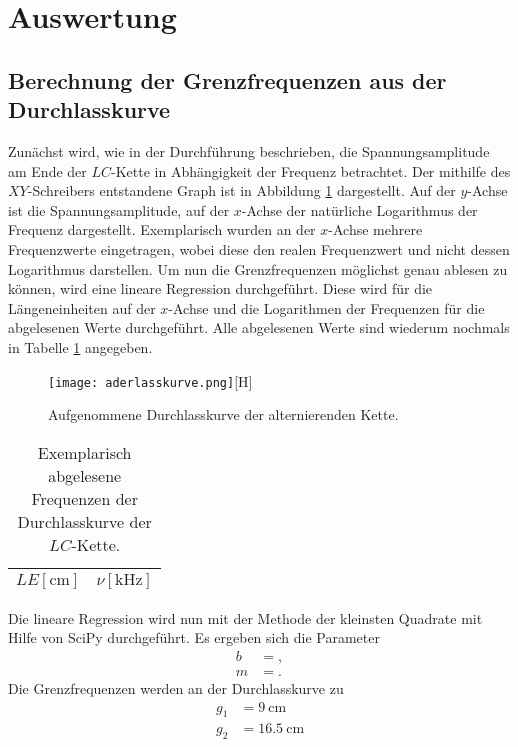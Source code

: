 \section{Auswertung}
\label{sec:Auswertung}
\subsection{Berechnung der Grenzfrequenzen aus der Durchlasskurve}
Zunächst wird, wie in der Durchführung beschrieben, die Spannungsamplitude am Ende der $LC$-Kette in Abhängigkeit der Frequenz betrachtet.
Der mithilfe des $XY$-Schreibers entstandene Graph ist in Abbildung \ref{fig:durchlass} dargestellt.
Auf der $y$-Achse ist die Spannungsamplitude, auf der $x$-Achse der natürliche Logarithmus der Frequenz dargestellt.
Exemplarisch wurden an der $x$-Achse mehrere Frequenzwerte eingetragen, wobei diese den realen Frequenzwert und nicht dessen Logarithmus darstellen.
Um nun die Grenzfrequenzen möglichst genau ablesen zu können, wird eine lineare Regression durchgeführt.
Diese wird für die Längeneinheiten auf der $x$-Achse und die Logarithmen der Frequenzen für die abgelesenen Werte durchgeführt.
Alle abgelesenen Werte sind wiederum nochmals in Tabelle \ref{tab:durchlass} angegeben.\\
\begin{figure}
  \centering
  \texttt{[image: aderlasskurve.png]}[H]
  \caption{Aufgenommene Durchlasskurve der alternierenden Kette.}
  \label{fig:durchlass}
\end{figure}
\begin{table}
  \centering
  \caption{Exemplarisch abgelesene Frequenzen der Durchlasskurve der $LC$-Kette.}
  \label{tab:durchlass}
  \begin{tabular}{c c}
    \toprule
    {$LE [\si{\centi\metre}]$} & {$\nu [\si{\kilo\hertz}]$}\\
    \midrule
    
    \bottomrule
  \end{tabular}
\end{table}
Die lineare Regression wird nun mit der Methode der kleinsten Quadrate mit Hilfe von SciPy durchgeführt.
Es ergeben sich die Parameter
\begin{align*}
  b &= , \\
  m &= .
\end{align*}
Die Grenzfrequenzen werden an der Durchlasskurve zu
\begin{align*}
  g_1 &= \SI{9}{\centi\metre} \\
  g_2 &= \SI{16.5}{\centi\metre}
\end{align*}
